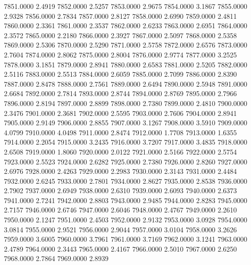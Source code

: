 7851.0000      2.4919
7852.0000      2.5257
7853.0000      2.9675
7854.0000      3.1867
7855.0000      2.9328
7856.0000      2.7834
7857.0000      2.8127
7858.0000      2.6990
7859.0000      2.4811
7860.0000      2.3361
7861.0000      2.3537
7862.0000      2.6233
7863.0000      2.6951
7864.0000      2.3572
7865.0000      2.2180
7866.0000      2.3927
7867.0000      2.5097
7868.0000      2.5358
7869.0000      2.5306
7870.0000      2.5290
7871.0000      2.5758
7872.0000      2.6576
7873.0000      2.7604
7874.0000      2.8062
7875.0000      2.8004
7876.0000      2.9774
7877.0000      3.2525
7878.0000      3.1851
7879.0000      2.8941
7880.0000      2.6583
7881.0000      2.5205
7882.0000      2.5116
7883.0000      2.5513
7884.0000      2.6059
7885.0000      2.7099
7886.0000      2.8390
7887.0000      2.8478
7888.0000      2.7561
7889.0000      2.6494
7890.0000      2.5948
7891.0000      2.6684
7892.0000      2.7814
7893.0000      2.8744
7894.0000      2.8769
7895.0000      2.7966
7896.0000      2.8194
7897.0000      2.8899
7898.0000      2.7380
7899.0000      2.4810
7900.0000      2.3476
7901.0000      2.3681
7902.0000      2.5595
7903.0000      2.7606
7904.0000      2.8941
7905.0000      2.9149
7906.0000      2.8855
7907.0000      3.1267
7908.0000      3.5910
7909.0000      4.0799
7910.0000      4.0498
7911.0000      2.8474
7912.0000      1.7708
7913.0000      1.6355
7914.0000      2.2054
7915.0000      3.2435
7916.0000      3.7207
7917.0000      3.4835
7918.0000      2.6508
7919.0000      1.8060
7920.0000      2.0122
7921.0000      2.5166
7922.0000      2.5754
7923.0000      2.5523
7924.0000      2.6282
7925.0000      2.7380
7926.0000      2.8260
7927.0000      2.6976
7928.0000      2.4263
7929.0000      2.2983
7930.0000      2.3143
7931.0000      2.4484
7932.0000      2.6245
7933.0000      2.7801
7934.0000      2.8627
7935.0000      2.8538
7936.0000      2.7902
7937.0000      2.6949
7938.0000      2.6310
7939.0000      2.6093
7940.0000      2.6373
7941.0000      2.7241
7942.0000      2.8803
7943.0000      2.9485
7944.0000      2.8283
7945.0000      2.7157
7946.0000      2.6746
7947.0000      2.6046
7948.0000      2.4767
7949.0000      2.2610
7950.0000      2.1247
7951.0000      2.4503
7952.0000      2.9132
7953.0000      3.0928
7954.0000      3.0814
7955.0000      2.9521
7956.0000      2.9044
7957.0000      3.0104
7958.0000      3.2626
7959.0000      3.6005
7960.0000      3.7961
7961.0000      3.7169
7962.0000      3.1241
7963.0000      2.4789
7964.0000      2.3443
7965.0000      2.4167
7966.0000      2.5010
7967.0000      2.6250
7968.0000      2.7864
7969.0000      2.8939
